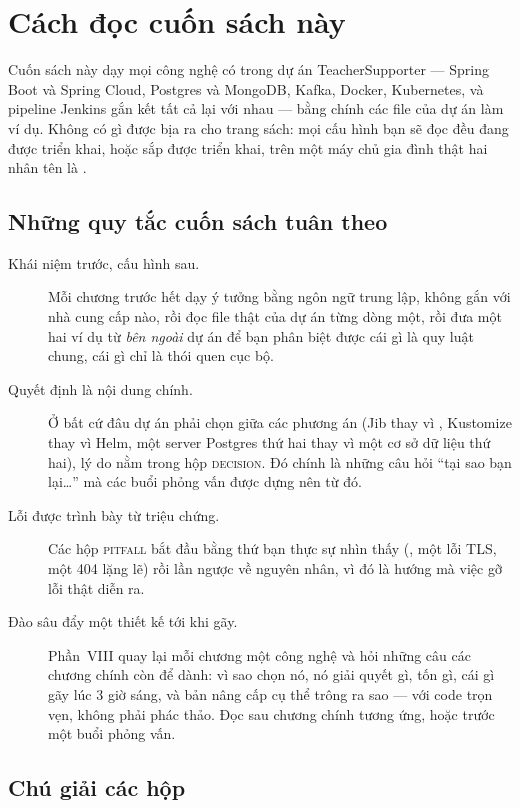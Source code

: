 \chapter{Cách đọc cuốn sách này}

Cuốn sách này dạy mọi công nghệ có trong dự án TeacherSupporter ---
Spring Boot và Spring Cloud, Postgres và MongoDB, Kafka, Docker,
Kubernetes, và pipeline Jenkins gắn kết tất cả lại với nhau --- bằng
chính các file của dự án làm ví dụ. Không có gì được bịa ra cho trang
sách: mọi cấu hình bạn sẽ đọc đều đang được triển khai, hoặc sắp được
triển khai, trên một máy chủ gia đình thật hai nhân tên là
.

\section*{Những quy tắc cuốn sách tuân theo}

\begin{description}
  \item[Khái niệm trước, cấu hình sau.] Mỗi chương trước hết dạy ý tưởng
  bằng ngôn ngữ trung lập, không gắn với nhà cung cấp nào, rồi đọc file
  thật của dự án từng dòng một, rồi đưa một hai ví dụ từ \emph{bên ngoài}
  dự án để bạn phân biệt được cái gì là quy luật chung, cái gì chỉ là thói
  quen cục bộ.
  \item[Quyết định là nội dung chính.] Ở bất cứ đâu dự án phải chọn giữa
  các phương án (Jib thay vì , Kustomize thay vì Helm,
  một server Postgres thứ hai thay vì một cơ sở dữ liệu thứ hai), lý do
  nằm trong hộp \textsc{decision}. Đó chính là những câu hỏi ``tại sao
  bạn lại\ldots'' mà các buổi phỏng vấn được dựng nên từ đó.
  \item[Lỗi được trình bày từ triệu chứng.] Các hộp \textsc{pitfall} bắt
  đầu bằng thứ bạn thực sự nhìn thấy (, một lỗi
  TLS, một 404 lặng lẽ) rồi lần ngược về nguyên nhân, vì đó là hướng mà
  việc gỡ lỗi thật diễn ra.
  \item[Đào sâu đẩy một thiết kế tới khi gãy.] Phần~VIII quay lại mỗi
  chương một công nghệ và hỏi những câu các chương chính còn để dành: vì
  sao chọn nó, nó giải quyết gì, tốn gì, cái gì gãy lúc 3 giờ sáng, và
  bản nâng cấp cụ thể trông ra sao --- với code trọn vẹn, không phải
  phác thảo. Đọc sau chương chính tương ứng, hoặc trước một buổi phỏng
  vấn.
\end{description}

\section*{Chú giải các hộp}

